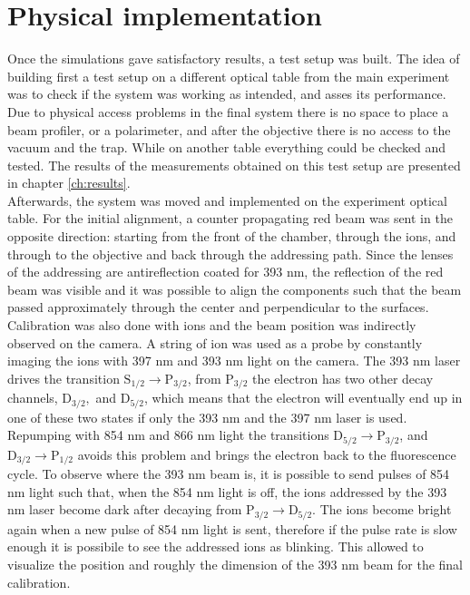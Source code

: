 \section{Physical implementation}
\label{design4}
Once the simulations gave satisfactory results, a test setup was built. The idea of building first a test setup on a different optical table from the main experiment was to check if the system was working as intended, and asses its performance. Due to physical access problems in the final system there is no space to place a beam profiler, or a polarimeter, and after the objective there is no access to the vacuum and the trap. While on another table everything could be checked and tested. The results of the measurements obtained on this test setup are presented in chapter \ref{ch:results}.\\
Afterwards, the system was moved and implemented on the experiment optical table. For the initial alignment, a counter propagating red beam was sent in the opposite direction: starting from the front of the chamber, through the ions, and through to the objective and back through the addressing path. Since the lenses of the addressing are antireflection coated for 393 nm, the reflection of the red beam was visible and it was possible to align the components such that the beam passed approximately through the center and perpendicular to the surfaces. Calibration was also done with ions and the beam position was indirectly observed on the camera. A string of ion was used as a probe by constantly imaging the ions with 397 nm and 393 nm light on the camera. The 393 nm laser drives the transition $\text{S}_{1/2}\to \text{P}_{3/2}$, from $\text{P}_{3/2}$ the electron has two other decay channels, $\text{D}_{3/2},$ and $\text{D}_{5/2}$, which means that the electron will eventually end up in one of these two states if only the 393 nm and the 397 nm laser is used. Repumping with 854 nm and 866 nm light the transitions $\text{D}_{5/2}\to \text{P}_{3/2}$, and $\text{D}_{3/2}\to \text{P}_{1/2}$ avoids this problem and brings the electron back to the fluorescence cycle. To observe where the 393 nm beam is, it is possible to send pulses of 854 nm light
such that, when the 854 nm light is off, the ions addressed by the 393 nm laser become dark after decaying from $\text{P}_{3/2}\to  \text{D}_{5/2}$. The ions become bright again when a new pulse of 854 nm light is sent, therefore if the pulse rate is slow enough it is possibile to see the addressed ions as blinking. This allowed to visualize the position and roughly the dimension of the 393 nm beam for the final calibration.\\
